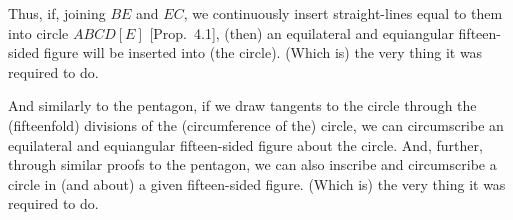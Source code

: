 \begin{Parallel}{}{}
{ Thus, if, joining $BE$ and $EC$, we continuously insert straight-lines
 equal to them into circle $ABCD[E]$ [Prop.~4.1],
 (then) an equilateral and equiangular fifteen-sided figure will be
 inserted into (the circle). (Which is) the very thing it was required to do.
 
 And similarly to the pentagon, if we draw  tangents to the circle through
the (fifteenfold) divisions of the (circumference of the) circle, we can
circumscribe an equilateral and equiangular fifteen-sided figure about
the circle. 
 And, further, through similar proofs to the  pentagon,
 we can also inscribe and circumscribe  a circle in (and about)  a given fifteen-sided 
  figure. (Which is) the very thing it was required to do.}
\end{Parallel}
